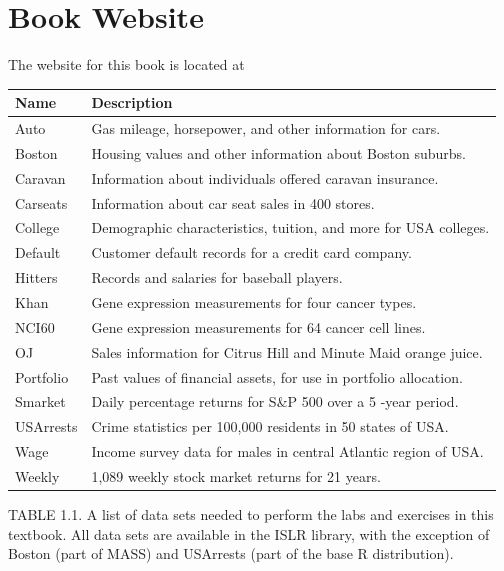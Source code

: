 \documentclass[10pt]{article}
\begin{document}
\section*{Book Website}
The website for this book is located at

\begin{center}
\begin{tabular}{|l|l|}
\hline
Name & Description \\
\hline
Auto & Gas mileage, horsepower, and other information for cars. \\
\hline
Boston & Housing values and other information about Boston suburbs. \\
\hline
Caravan & Information about individuals offered caravan insurance. \\
\hline
Carseats & Information about car seat sales in 400 stores. \\
\hline
College & Demographic characteristics, tuition, and more for USA colleges. \\
\hline
Default & Customer default records for a credit card company. \\
\hline
Hitters & Records and salaries for baseball players. \\
\hline
Khan & Gene expression measurements for four cancer types. \\
\hline
NCI60 & Gene expression measurements for 64 cancer cell lines. \\
\hline
OJ & Sales information for Citrus Hill and Minute Maid orange juice. \\
\hline
Portfolio & Past values of financial assets, for use in portfolio allocation. \\
\hline
Smarket & Daily percentage returns for S\&P 500 over a 5 -year period. \\
\hline
USArrests & Crime statistics per 100,000 residents in 50 states of USA. \\
\hline
Wage & Income survey data for males in central Atlantic region of USA. \\
\hline
Weekly & 1,089 weekly stock market returns for 21 years. \\
\hline
\end{tabular}
\end{center}

TABLE 1.1. A list of data sets needed to perform the labs and exercises in this textbook. All data sets are available in the ISLR library, with the exception of Boston (part of MASS) and USArrests (part of the base R distribution).
\end{document}
